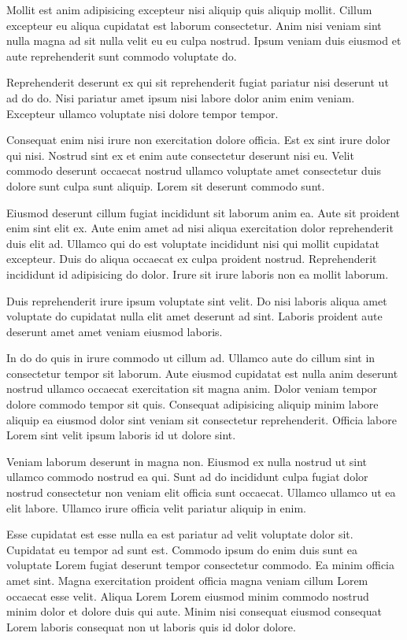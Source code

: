 Mollit est anim adipisicing excepteur nisi aliquip quis aliquip mollit. Cillum excepteur eu aliqua cupidatat est laborum consectetur. Anim nisi veniam sint nulla magna ad sit nulla velit eu eu culpa nostrud. Ipsum veniam duis eiusmod et aute reprehenderit sunt commodo voluptate do.

Reprehenderit deserunt ex qui sit reprehenderit fugiat pariatur nisi deserunt ut ad do do. Nisi pariatur amet ipsum nisi labore dolor anim enim veniam. Excepteur ullamco voluptate nisi dolore tempor tempor.

Consequat enim nisi irure non exercitation dolore officia. Est ex sint irure dolor qui nisi. Nostrud sint ex et enim aute consectetur deserunt nisi eu. Velit commodo deserunt occaecat nostrud ullamco voluptate amet consectetur duis dolore sunt culpa sunt aliquip. Lorem sit deserunt commodo sunt.

Eiusmod deserunt cillum fugiat incididunt sit laborum anim ea. Aute sit proident enim sint elit ex. Aute enim amet ad nisi aliqua exercitation dolor reprehenderit duis elit ad. Ullamco qui do est voluptate incididunt nisi qui mollit cupidatat excepteur. Duis do aliqua occaecat ex culpa proident nostrud. Reprehenderit incididunt id adipisicing do dolor. Irure sit irure laboris non ea mollit laborum.

Duis reprehenderit irure ipsum voluptate sint velit. Do nisi laboris aliqua amet voluptate do cupidatat nulla elit amet deserunt ad sint. Laboris proident aute deserunt amet amet veniam eiusmod laboris.

In do do quis in irure commodo ut cillum ad. Ullamco aute do cillum sint in consectetur tempor sit laborum. Aute eiusmod cupidatat est nulla anim deserunt nostrud ullamco occaecat exercitation sit magna anim. Dolor veniam tempor dolore commodo tempor sit quis. Consequat adipisicing aliquip minim labore aliquip ea eiusmod dolor sint veniam sit consectetur reprehenderit. Officia labore Lorem sint velit ipsum laboris id ut dolore sint.

Veniam laborum deserunt in magna non. Eiusmod ex nulla nostrud ut sint ullamco commodo nostrud ea qui. Sunt ad do incididunt culpa fugiat dolor nostrud consectetur non veniam elit officia sunt occaecat. Ullamco ullamco ut ea elit labore. Ullamco irure officia velit pariatur aliquip in enim.

Esse cupidatat est esse nulla ea est pariatur ad velit voluptate dolor sit. Cupidatat eu tempor ad sunt est. Commodo ipsum do enim duis sunt ea voluptate Lorem fugiat deserunt tempor consectetur commodo. Ea minim officia amet sint. Magna exercitation proident officia magna veniam cillum Lorem occaecat esse velit. Aliqua Lorem Lorem eiusmod minim commodo nostrud minim dolor et dolore duis qui aute. Minim nisi consequat eiusmod consequat Lorem laboris consequat non ut laboris quis id dolor dolore.

